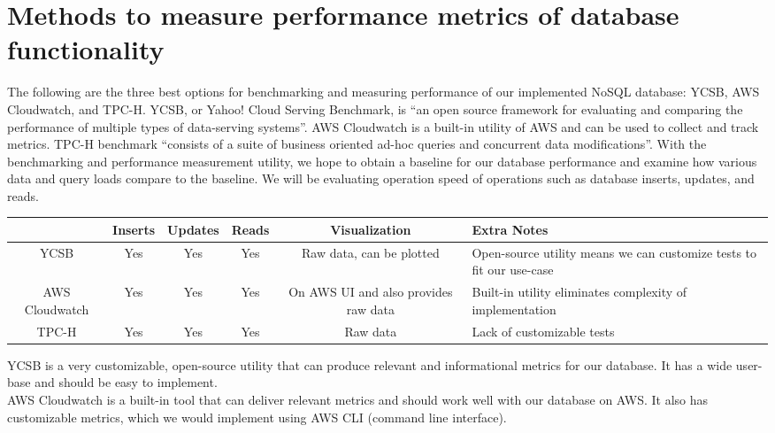 \section{Methods to measure performance metrics of database functionality}
        The following are the three best options for benchmarking and measuring performance of our implemented NoSQL database: YCSB, AWS Cloudwatch, and TPC-H. YCSB, or Yahoo! Cloud Serving Benchmark, is “an open source framework for evaluating and comparing the performance of multiple types of data-serving systems”\cite{I1}. AWS Cloudwatch is a built-in utility of AWS and can be used to collect and track metrics. TPC-H benchmark “consists of a suite of business oriented ad-hoc queries and concurrent data modifications”\cite{I2}. With the benchmarking and performance measurement utility, we hope to obtain a baseline for our database performance and examine how various data and query loads compare to the baseline. We will be evaluating operation speed of operations such as database inserts, updates, and reads.
        
        \begin{table}[ht]
        \begin{tabular}{|c|c|c|c|c|p{5cm}|}
            \hline
            \textbf{} & \textbf{Inserts} & \textbf{Updates} & \textbf{Reads} & \textbf{Visualization} & \textbf{Extra Notes}\\
            \hline
            YCSB & Yes & Yes & Yes & Raw data, can be plotted & Open-source utility means we can customize tests to fit our use-case\\
            \hline
            AWS Cloudwatch & Yes & Yes & Yes & On AWS UI and also provides raw data & Built-in utility eliminates complexity of implementation\\
            \hline
            TPC-H & Yes & Yes & Yes & Raw data &Lack of customizable tests\\
            \hline
        \end{tabular}
        \end{table}
       
        \noindent YCSB is a very customizable, open-source utility that can produce relevant and informational metrics for our database. It has a wide user-base and should be easy to implement. \\
    
        \noindent AWS Cloudwatch is a built-in tool that can deliver relevant metrics and should work well with our database on AWS. It also has customizable metrics, which we would implement using AWS CLI (command line interface).\\ 
        

